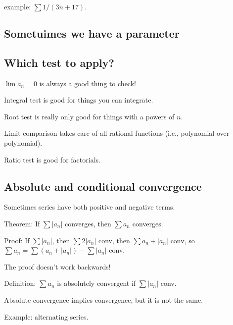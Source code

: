 \documentclass[12pt]{article}
\begin{document}
example: $\sum 1/(3n + 17)$.

\subsection{Sometuimes we have a parameter}

\subsection*{Which test to apply?}

$\lim a_n = 0$ is always a good thing to check!

Integral test is good for things you can integrate.

Root test is really only good for things with a powers of $n$.

Limit comparison takes care of all rational functions (i.e., polynomial
over polynomial).

Ratio test is good for factorials.

\subsection*{Absolute and conditional convergence}

Sometimes series have both positive and negative terms.

Theorem: If $\sum |a_n|$ converges, then $\sum a_n$ converges.

Proof: If $\sum |a_n|$, then $\sum 2|a_n|$ conv, then $\sum a_n + |a_n|$ conv, so $\sum a_n = \sum (a_n + |a_n|) - \sum |a_n|$ conv.

The proof doesn't work backwards!

Definition: $\sum a_n$ is absolutely convergent if $\sum |a_n|$ conv.

Absolute convergence implies convergence, but it is not the same.

Example: alternating series.
\end{document}
